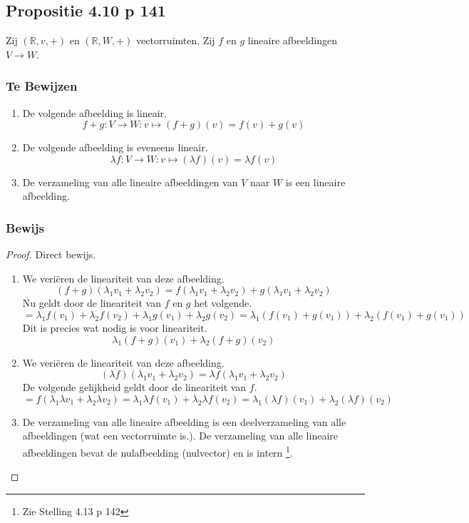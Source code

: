 \documentclass[lineaire_algebra_oplossingen.tex]{subfiles}
\begin{document}
\subsection{Propositie 4.10 p 141}
Zij $(\mathbb{R},v,+)$ en $(\mathbb{R},W,+)$ vectorruimten. Zij $f$ en $g$ lineaire afbeeldingen $V\rightarrow W$.
\subsubsection*{Te Bewijzen}
\begin{enumerate}
\item De volgende afbeelding is lineair.
\[f+g: V \rightarrow W: v\mapsto(f+g)(v)=f(v)+g(v)\]

\item De volgende afbeelding is eveneens lineair.
\[\lambda f: V\rightarrow W: v\mapsto (\lambda f)(v) = \lambda f(v)\]

\item De verzameling van alle lineaire afbeeldingen van $V$ naar $W$ is een lineaire afbeelding.

\end{enumerate}
\subsubsection*{Bewijs}
\begin{proof}
Direct bewijs.
\begin{enumerate}
\item
We veri\"eren de lineariteit van deze afbeelding.
\[
(f+g)(\lambda_1v_1+\lambda_2v_2) = f(\lambda_1v_1+\lambda_2v_2) + g(\lambda_1v_1+\lambda_2v_2)
\]
Nu geldt door de lineariteit van $f$ en $g$ het volgende.
\[
= \lambda_1f(v_1)+\lambda_2f(v_2) + \lambda_1g(v_1)+\lambda_2g(v_2) = \lambda_1(f(v_1)+g(v_1)) + \lambda_2(f(v_1)+g(v_1))
\]
Dit is precies wat nodig is voor lineariteit.
\[
\lambda_1(f+g)(v_1)+\lambda_2(f+g)(v_2)
\]

\item
We veri\"eren de lineariteit van deze afbeelding.
\[
(\lambda f)(\lambda_1v_1+\lambda_2v_2) = \lambda f(\lambda_1v_1+\lambda_2v_2)
\]
De volgende gelijkheid geldt door de lineariteit van $f$. 
\[
=  f(\lambda_1\lambda v_1+\lambda_2\lambda v_2) = \lambda_1\lambda f(v_1)+\lambda_2\lambda f(v_2) = 
\lambda_1(\lambda f)(v_1)+\lambda_2(\lambda f)(v_2)
\]

\item
De verzameling van alle lineaire afbeelding is een deelverzameling van alle afbeeldingen (wat een vectorruimte is.). De verzameling van alle lineaire afbeeldingen bevat de nulafbeelding (nulvector) en is intern \footnote{Zie Stelling 4.13 p 142}.

\end{enumerate}
\end{proof}
\end{document}
